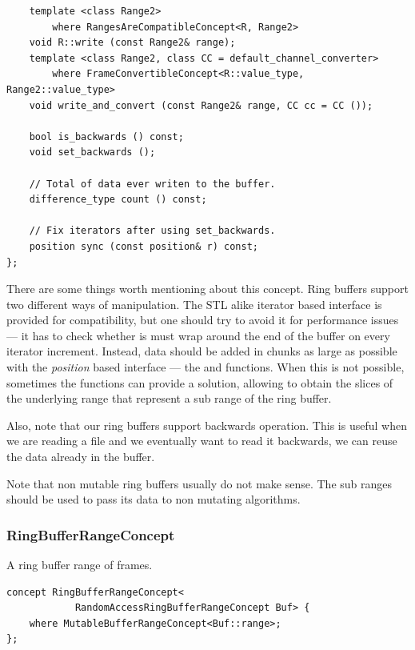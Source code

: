 \begin{lstlisting}
    template <class Range2>
        where RangesAreCompatibleConcept<R, Range2>
    void R::write (const Range2& range);
    template <class Range2, class CC = default_channel_converter>
        where FrameConvertibleConcept<R::value_type, Range2::value_type>
    void write_and_convert (const Range2& range, CC cc = CC ());

    bool is_backwards () const;
    void set_backwards ();
    
    // Total of data ever writen to the buffer.
    difference_type count () const;

    // Fix iterators after using set_backwards.
    position sync (const position& r) const;
};
\end{lstlisting}

There are some things worth mentioning about this concept. Ring
buffers support two different ways of manipulation. The STL alike
iterator based interface is provided for compatibility, but one should
try to avoid it for performance issues --- it has to check whether is
must wrap around the end of the buffer on every iterator
increment. Instead, data should be added in chunks as large as
possible with the \emph{position} based interface --- the 
and  functions. When this is not possible, sometimes the
 functions can provide a solution, allowing to
obtain the slices of the underlying range that represent a sub range
of the ring buffer.


Also, note that our ring buffers support backwards operation. This is
useful when we are reading a file and we eventually want to read it
backwards, we can reuse the data already in the buffer.

Note that non mutable ring buffers usually do not make sense. The sub
ranges should be used to pass its data to non mutating algorithms.

\subsubsection{RingBufferRangeConcept}

A ring buffer range of frames.

\begin{lstlisting}
concept RingBufferRangeConcept<
            RandomAccessRingBufferRangeConcept Buf> {
    where MutableBufferRangeConcept<Buf::range>;
};
\end{lstlisting}


